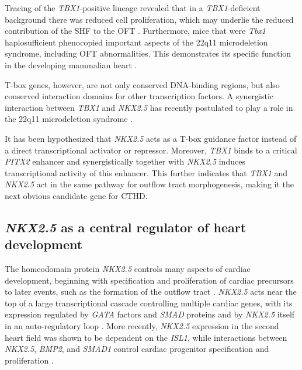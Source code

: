 \begin{refsection}
Tracing of the \textit{TBX1}-positive lineage revealed that in a \textit{TBX1}-deficient background there was reduced cell proliferation, which may underlie the reduced contribution of the SHF to the OFT \cite{naiche2005t,plageman2005t,stennard2005t}. Furthermore, mice that were \textit{Tbx1} haplosufficient phenocopied important aspects of the 22q11 microdeletion syndrome, including OFT abnormalities. This demonstrates its specific function in the developing mammalian heart \cite{merscher2001tbx1,jerome2001digeorge,liao2004full}.


T-box genes, however, are not only conserved DNA-binding regions, but also conserved interaction domains for other transcription factors. A synergistic interaction between \textit{TBX1} and \textit{NKX2.5} has recently postulated to play a role in the 22q11 microdeletion syndrome \cite{nowotschin2006tbx1}.

It has been hypothesized that \textit{NKX2.5} acts as a T-box guidance factor instead of a direct transcriptional activator or repressor. Moreover, \textit{TBX1} binds to a critical \textit{PITX2} enhancer and synergistically together with \textit{NKX2.5} induces transcriptional activity of this enhancer. This further indicates that \textit{TBX1} and \textit{NKX2.5} act in the same pathway for outflow tract morphogenesis, making it the next obvious candidate gene for CTHD.

\subsection{\textit{NKX2.5} as a central regulator of heart development}

The homeodomain protein \textit{NKX2.5} controls many aspects of cardiac development, beginning with specification and proliferation of cardiac precursors to later events, such as the formation of the outflow tract \cite{harvey2002patterning}. \textit{NKX2.5} acts near the top of a large transcriptional cascade controlling multiple cardiac genes, with its expression regulated by \textit{GATA} factors and \textit{SMAD} proteins and by \textit{NKX2.5} itself in an auto-regulatory loop \cite{liberatore2002nkx,lien2002cardiac,lien1999control,searcy1998gata}. More recently, \textit{NKX2.5} expression in the second heart field was shown to be dependent on the \textit{ISL1}, while interactions between \textit{NKX2.5}, \textit{BMP2}, and \textit{SMAD1} control cardiac progenitor specification and proliferation \cite{prall2007nkx2,takeuchi2005tbx20}.


\end{refsection}
